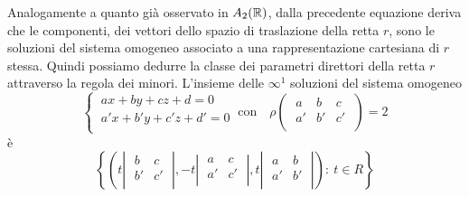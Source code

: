 \documentclass[twoside]{report}
\begin{document}
Analogamente a quanto già osservato in \(A_2(\RR )\), dalla precedente equazione deriva che le componenti, dei vettori dello spazio di traslazione della retta \(r\), sono le soluzioni del sistema omogeneo associato a una rappresentazione cartesiana di \(r\) stessa. Quindi possiamo dedurre la classe dei parametri direttori della retta \(r\) attraverso la regola dei minori. L'insieme delle \(\infty^{1}\) soluzioni del sistema omogeneo \[
\begin{cases}
    \ ax + by + cz + d = 0 \\
    \ a'x + b'y + c'z + d' = 0 \\
\end{cases} \ \text{con} \quad \rho
\left( \; \begin{matrix}
    a & b & c \\
    a' & b' & c' \\
\end{matrix} \; \right) = 2
\] è \[
\left\{ \left( t
\left| \; \begin{matrix}
    b & c \\
    b' & c' \\
\end{matrix} \; \right|,
-t
\left| \; \begin{matrix}
    a & c \\
    a' & c' \\
\end{matrix} \; \right|, t
\left| \; \begin{matrix}
    a & b \\
    a' & b' \\
\end{matrix} \; \right| \right)
: \ t \in R \right\}
\] 
\end{document}
